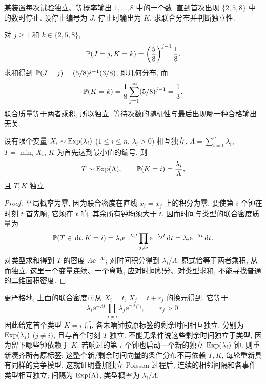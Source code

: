 \begin{example}
某装置每次试验独立、等概率输出 $1,\ldots,8$ 中的一个数. 直到首次出现 $\{2,5,8\}$ 中的数时停止. 设停止编号为 $J$, 停止时输出为 $K$. 求联合分布并判断独立性.
\end{example}
\begin{solution}
对 $j\ge1$ 和 $k\in\{2,5,8\}$,
\[
 \mathbb P(J=j,K=k)=\left(\frac58\right)^{j-1}\frac18.
\]
求和得到 $\mathbb P(J=j)=(5/8)^{j-1}(3/8)$, 即几何分布, 而
\[
 \mathbb P(K=k)=\frac18\sum_{j=1}^\infty(5/8)^{j-1}=\frac13.
\]
联合质量等于两者乘积, 所以独立. 等待次数的随机性与最后出现哪一种合格输出无关.
\end{solution}


\begin{proposition}[首个时刻与首个类型]
设有限个变量 $X_i\sim\operatorname{Exp}(\lambda_i)$ ($1\leq i\leq n$, $\lambda_i>0$) 相互独立, $\Lambda=\sum_{i=1}^n\lambda_i$, $T=\min_iX_i$, $K$ 为首先达到最小值的编号. 则
\[
 T\sim\operatorname{Exp}(\Lambda),\qquad
 \mathbb P(K=i)=\frac{\lambda_i}{\Lambda},
\]
且 $T,K$ 独立.
\end{proposition}
\begin{proof}
平局概率为零, 因为联合密度在直线 $x_i=x_j$ 上的积分为零. 要使第 $i$ 个钟在时刻 $t$ 首先响, 它须在 $t$ 响, 其余所有钟均须大于 $t$. 因而时间与类型的联合密度质量为
\[
 \mathbb P(T\in\,\mathrm d t,K=i)=\lambda_i\mathrm e^{-\lambda_i t}
                 \prod_{j\ne i}\mathrm e^{-\lambda_jt}\,\mathrm d t
 =\lambda_i\mathrm e^{-\Lambda t}\,\mathrm d t.
\]
对类型求和得到 $T$ 的密度 $\Lambda\ee^{-\Lambda t}$; 对时间积分得到 $\lambda_i/\Lambda$. 原式恰等于两者乘积, 从而独立. 这里一个变量连续、一个离散, 应对时间积分、对类型求和, 不能寻找普通的二维面积密度.
\end{proof}

更严格地, 上面的联合密度可从 $X_i=t$, $X_j=t+r_j$ 的换元得到. 它等于
\[
 \lambda_i\ee^{-\Lambda t}\prod_{j\ne i}\lambda_j\ee^{-\lambda_jr_j},
 \qquad r_j>0.
\]
因此给定首个类型 $K=i$ 后, 各未响钟按原标签的剩余时间相互独立, 分别为 $\operatorname{Exp}(\lambda_j)$ ($j\ne i$), 且与首个时刻 $T$ 独立. 不能无条件说这些剩余时间独立于类型, 因为留下哪些钟依赖于 $K$. 若响过的第 $i$ 个钟也启动一个新的独立 $\operatorname{Exp}(\lambda_i)$ 钟, 则重新凑齐所有原标签; 这整个新/剩余时间向量的条件分布不再依赖 $T,K$, 每轮重新具有同样的竞争模型. 这就证明叠加独立 Poisson 过程后, 连续的相邻间隔和各事件类型相互独立; 间隔为 $\operatorname{Exp}(\Lambda)$, 类型概率为 $\lambda_i/\Lambda$.

